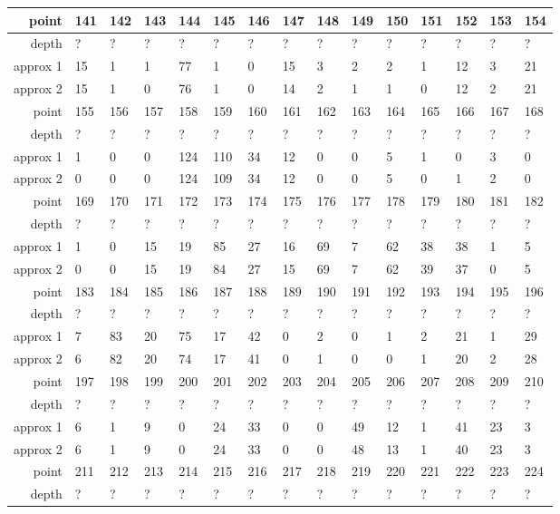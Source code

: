 \begin{center}
\begin{supertabular}{|r|l l l l l l l l l l l l l l|}
point & 141 & 142 & 143 & 144 & 145 & 146 & 147 & 148 & 149 & 150 & 151 & 152 & 153 & 154 \\
\hline
depth & ? & ? & ? & ? & ? & ? & ? & ? & ? & ? & ? & ? & ? & ? \\
approx 1 & 15 & 1 & 1 & 77 & 1 & 0 & 15 & 3 & 2 & 2 & 1 & 12 & 3 & 21 \\
approx 2 & 15 & 1 & 0 & 76 & 1 & 0 & 14 & 2 & 1 & 1 & 0 & 12 & 2 & 21 \\
\hline
point & 155 & 156 & 157 & 158 & 159 & 160 & 161 & 162 & 163 & 164 & 165 & 166 & 167 & 168 \\
\hline
depth & ? & ? & ? & ? & ? & ? & ? & ? & ? & ? & ? & ? & ? & ? \\
approx 1 & 1 & 0 & 0 & 124 & 110 & 34 & 12 & 0 & 0 & 5 & 1 & 0 & 3 & 0 \\
approx 2 & 0 & 0 & 0 & 124 & 109 & 34 & 12 & 0 & 0 & 5 & 0 & 1 & 2 & 0 \\
\hline
point & 169 & 170 & 171 & 172 & 173 & 174 & 175 & 176 & 177 & 178 & 179 & 180 & 181 & 182 \\
\hline
depth & ? & ? & ? & ? & ? & ? & ? & ? & ? & ? & ? & ? & ? & ? \\
approx 1 & 1 & 0 & 15 & 19 & 85 & 27 & 16 & 69 & 7 & 62 & 38 & 38 & 1 & 5 \\
approx 2 & 0 & 0 & 15 & 19 & 84 & 27 & 15 & 69 & 7 & 62 & 39 & 37 & 0 & 5 \\
\hline
point & 183 & 184 & 185 & 186 & 187 & 188 & 189 & 190 & 191 & 192 & 193 & 194 & 195 & 196 \\
\hline
depth & ? & ? & ? & ? & ? & ? & ? & ? & ? & ? & ? & ? & ? & ? \\
approx 1 & 7 & 83 & 20 & 75 & 17 & 42 & 0 & 2 & 0 & 1 & 2 & 21 & 1 & 29 \\
approx 2 & 6 & 82 & 20 & 74 & 17 & 41 & 0 & 1 & 0 & 0 & 1 & 20 & 2 & 28 \\
\hline
point & 197 & 198 & 199 & 200 & 201 & 202 & 203 & 204 & 205 & 206 & 207 & 208 & 209 & 210 \\
\hline
depth & ? & ? & ? & ? & ? & ? & ? & ? & ? & ? & ? & ? & ? & ? \\
approx 1 & 6 & 1 & 9 & 0 & 24 & 33 & 0 & 0 & 49 & 12 & 1 & 41 & 23 & 3 \\
approx 2 & 6 & 1 & 9 & 0 & 24 & 33 & 0 & 0 & 48 & 13 & 1 & 40 & 23 & 3 \\
\hline
point & 211 & 212 & 213 & 214 & 215 & 216 & 217 & 218 & 219 & 220 & 221 & 222 & 223 & 224 \\
\hline
depth & ? & ? & ? & ? & ? & ? & ? & ? & ? & ? & ? & ? & ? & ? \\

\end{supertabular}
\end{center}
